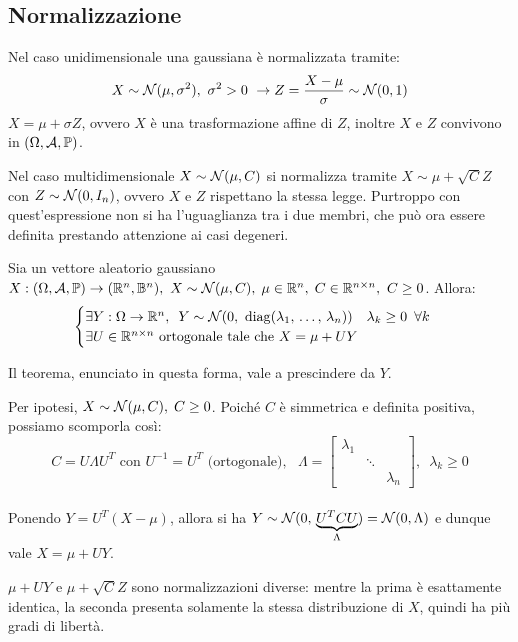 \subsection{Normalizzazione}
Nel caso unidimensionale una gaussiana è normalizzata tramite:
 $$X \sim \mathcal N(\mu, \sigma^2), \ \sigma^2>0 \ \to Z = \frac{X-\mu}{\sigma} \sim \mathcal N(0,1) $$
$X= \mu + \sigma Z$, ovvero $X$ è una trasformazione affine di $Z$, inoltre $X$ e $Z$ convivono in $(\Omega, \mathcal A, \mathbb P)$.

Nel caso multidimensionale $X\sim \mathcal N(\mu, C)$ si normalizza tramite $X \sim \mu + \sqrt{C}Z$ con  $Z \sim \mathcal N(0, I_n)$, ovvero $X$ e $Z$ rispettano la stessa legge.
Purtroppo con quest'espressione non si ha l'uguaglianza tra i due membri, che può ora essere definita prestando attenzione ai casi degeneri.

\medskip
\begin{teob}[\JPTh{16.2}]
  Sia un vettore aleatorio gaussiano $X: (\Omega, \mathcal A, \mathbb P) \to (\mathbb R^n, \mathbb B^n), \ X \sim \mathcal N(\mu, C), \; \mu \in \mathbb R^n, \; C \in \mathbb R^{n \times n}, \ C \ge 0$. Allora:
  $$\begin{cases}
  \exists Y: \Omega \to \RR^n, \enspace Y \sim \Nc(0, \ \operatorname{diag}(\lambda_1, \, \dots, \, \lambda_n)) \quad \lambda_k \ge 0 \enspace \forall k\\
  \exists U \in \RR^{n \times n} \text{ ortogonale tale che } X=\mu +UY
  \end{cases}$$
  \Fixvmode
\end{teob}
Il teorema, enunciato in questa forma, vale a prescindere da $Y$.

\begin{dimo}
  Per ipotesi, $X \sim \mathcal N(\mu, C), \; C \ge 0$. Poiché $C$ è simmetrica e definita positiva, possiamo scomporla così:
  $$C=U \Lambda U^T \text{ con } U^{-1}=U^T \text{ (ortogonale), } \enspace \Lambda= \begin{bmatrix} \lambda_1 &  &  \\  & \ddots &  \\ &  & \lambda_n \end{bmatrix}, \enspace \lambda_k \ge 0$$ \\
  Ponendo $Y=U^T(X-\mu)$, allora si ha $Y \sim \mathcal N(0, \, \underbrace{U^TCU}_{\Lambda})=\mathcal N(0, \Lambda)$ e dunque vale $X=\mu + UY$.
\end{dimo}

\medskip
\begin{nb}
  $\mu + UY$ e $\mu + \sqrt{C}Z$ sono normalizzazioni diverse: mentre la prima è esattamente identica, la seconda presenta solamente la stessa distribuzione di $X$, quindi ha più gradi di libertà.
\end{nb}

